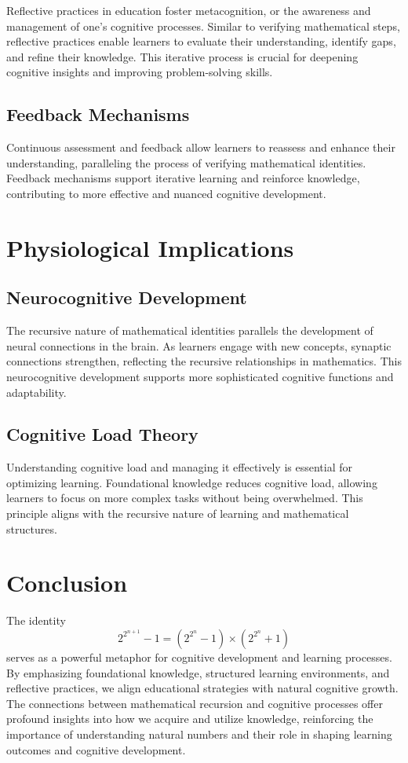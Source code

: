 \documentclass{article}
\begin{document}
Reflective practices in education foster metacognition, or the awareness and management of one's cognitive processes. Similar to verifying mathematical steps, reflective practices enable learners to evaluate their understanding, identify gaps, and refine their knowledge. This iterative process is crucial for deepening cognitive insights and improving problem-solving skills.

\subsection{Feedback Mechanisms}

Continuous assessment and feedback allow learners to reassess and enhance their understanding, paralleling the process of verifying mathematical identities. Feedback mechanisms support iterative learning and reinforce knowledge, contributing to more effective and nuanced cognitive development.

\section{Physiological Implications}

\subsection{Neurocognitive Development}

The recursive nature of mathematical identities parallels the development of neural connections in the brain. As learners engage with new concepts, synaptic connections strengthen, reflecting the recursive relationships in mathematics. This neurocognitive development supports more sophisticated cognitive functions and adaptability.

\subsection{Cognitive Load Theory}

Understanding cognitive load and managing it effectively is essential for optimizing learning. Foundational knowledge reduces cognitive load, allowing learners to focus on more complex tasks without being overwhelmed. This principle aligns with the recursive nature of learning and mathematical structures.

\section{Conclusion}

The identity 
\[
2^{2^{n + 1}} - 1 = (2^{2^n} - 1) \times (2^{2^n} + 1)
\]
serves as a powerful metaphor for cognitive development and learning processes. By emphasizing foundational knowledge, structured learning environments, and reflective practices, we align educational strategies with natural cognitive growth. The connections between mathematical recursion and cognitive processes offer profound insights into how we acquire and utilize knowledge, reinforcing the importance of understanding natural numbers and their role in shaping learning outcomes and cognitive development.
\end{document}
